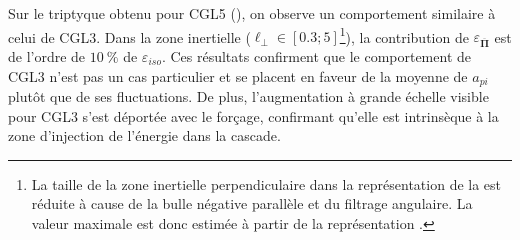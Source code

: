  
 Sur le triptyque obtenu pour CGL5 (), on observe un comportement similaire à celui de CGL3. Dans la zone inertielle ($\ell_{\perp} \in [\num{0.3};\num{5}]$\footnote{La taille de la zone inertielle perpendiculaire dans la représentation  de la  est réduite à cause de la \og bulle \fg{} négative parallèle et du filtrage angulaire. La valeur maximale est donc estimée à partir de la représentation .}), la contribution de $\varepsilon_{\overline{\boldsymbol{\Pi}}}$ est de l'ordre de $\SI{10}{\%}$ de $\varepsilon_{iso}$. Ces résultats confirment que le comportement de CGL3 n'est pas un cas particulier et se placent en faveur de la moyenne de $a_{pi}$ plutôt que de ses fluctuations. De plus, l'augmentation à grande échelle visible pour CGL3 s'est déportée avec le forçage, confirmant qu'elle est intrinsèque à la zone d'injection de l'énergie dans la cascade.  


